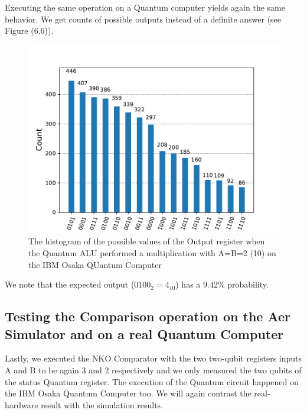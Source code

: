 Executing the same operation on a Quantum computer yields again the same behavior. We get counts of possible outputs instead of a definite answer (see Figure (6.6)).

\begin{figure}[!ht]
        \centering
        \includegraphics[scale=0.7]{images/6_Complete_System/multiplier_ibmq_result.pdf}
        \caption{The histogram of the possible values of the Output register when the Quantum ALU performed a multiplication with A=B=2 (10) on the IBM Osaka QUantum Computer}
\end{figure}

We note that the expected output ($0100_2=4_{10}$) has a $9.42\%$ probability.

\newpage
\subsection{Testing the Comparison operation on the Aer Simulator and on a real Quantum Computer}
Lastly, we executed the NKO Comparator with the two two-qubit registers inputs A and B to be again $3$ and $2$ respectively and we only measured the two qubits
of the status Quantum register. The execution of the Quantum circuit happened on the IBM Osaka Quantum Computer too. We will again contrast the real-hardware result with the
simulation results.

